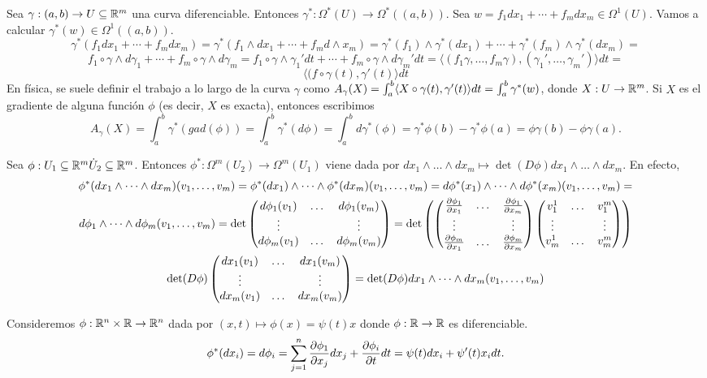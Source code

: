 \documentclass[CV.tex]{subfiles}
\begin{document}
\begin{ej}
Sea $\gamma:(a,b)\to U\subseteq\mathbb{R}^m$ una curva diferenciable. Entonces $\gamma^*:\Omega^*(U)\to\Omega^*((a,b))$. Sea $w=f_1dx_1+\cdots+f_m dx_m\in\Omega^1(U)$. Vamos a calcular $\gamma^*(w)\in\Omega^1((a,b))$.
\[
\gamma^*(f_1dx_1+\cdots+f_m dx_m)=\gamma^*(f_1\land dx_1+\cdots+f_m d\land x_m)=\gamma^*(f_1)\land\gamma^*(dx_1)+\cdots+\gamma^*(f_m)\land\gamma^*(dx_m)=
\]
\[
f_1\circ\gamma\land d\gamma_1+\cdots+f_m\circ\gamma\land d\gamma_m=f_1\circ\gamma\land \gamma_1'dt+\cdots+f_m\circ\gamma\land d\gamma_m'dt=\langle (f_1\gamma,\dots,f_m\gamma),(\gamma_1',\dots,\gamma_m')\rangle dt=
\]
\[
\langle (f\circ\gamma(t),\gamma'(t)\rangle dt
\]
En física, se suele definir el trabajo a lo largo de la curva $\gamma$ como $A_{\gamma}(X)=\int_a^b\langle{X\circ\gamma(t),\gamma'(t)}\rangle dt=\int_a^b\gamma^*(w)$, donde $X:U\to\mathbb{R}^m$. Si $X$ es el gradiente de alguna función $\phi$ (es decir, $X$ es exacta), entonces escribimos 
\[
A_{\gamma}(X)=\int_a^b\gamma^*(gad(\phi))=\int_a^b\gamma^*(d\phi)=\int_a^b d\gamma^*(\phi)=\gamma^*\phi(b)-\gamma^*\phi(a)=\phi\gamma(b)-\phi\gamma(a).
\]
\end{ej}
\begin{ej}
Sea $\phi:U_1\subseteq\mathbb{R}^m\dot U_2\subseteq\mathbb{R}^m$. Entonces $\phi^*:\Omega^m(U_2)\to\Omega^m(U_1)$ viene dada por $dx_1\land\dots\land dx_m\mapsto \det(D\phi)dx_1\land\dots\land dx_m$. En efecto,
\begin{gather*}
\phi^*(dx_1\land\dots\land dx_m)(v_1,\dots, v_m)=\phi^*(dx_1)\land\dots\land\phi^*(dx_m)(v_1,\dots,v_m)=d\phi^*(x_1)\land\dots\land d\phi^*(x_m)(v_1,\dots, v_m)=\\
d\phi_1\land\dots\land d\phi_m(v_1,\dots, v_m)=\det\begin{pmatrix}
d\phi_1(v_1) & \dots & d\phi_1(v_m)\\
\vdots & &\vdots\\
d\phi_m(v_1) & \dots & d\phi_m(v_m)
\end{pmatrix}=\det\left(\begin{pmatrix}
\frac{\partial \phi_1}{\partial x_1} &\dots & \frac{\partial \phi_1}{\partial x_m}\\
\vdots & & \vdots\\
\frac{\partial \phi_m}{\partial x_1} & \dots & \frac{\partial \phi_m}{\partial x_m}
\end{pmatrix}\begin{pmatrix}
v_1^1 & \dots & v^m_1\\
\vdots & & \vdots\\
v_m^1 & \dots & v^m_m
\end{pmatrix}\right)\\
\det(D\phi)\begin{pmatrix}
dx_1(v_1) & \dots & dx_1(v_m)\\
\vdots & & \vdots\\
dx_m(v_1) & \dots & dx_m(v_m)
\end{pmatrix}=\det(D\phi)dx_1\land\dots\land dx_m(v_1,\dots, v_m)
\end{gather*}
\end{ej}

\begin{ej}
Consideremos $\phi:\mathbb{R}^n\times\mathbb{R}\to\mathbb{R}^n$ dada por $(x,t)\mapsto\phi(x)=\psi(t)x$ donde $\phi:\mathbb{R}\to\mathbb{R}$ es diferenciable. 
\[
\phi^*(dx_i)=d\phi_i=\sum_{j=1}^n\frac{\partial \phi_1}{\partial x_j}dx_j+\frac{\partial \phi_i}{\partial t}dt=\psi(t)dx_i+\psi'(t)x_idt.
\]
\end{ej}
\end{document}
